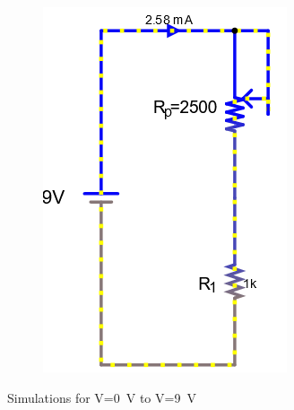 \documentclass[a4paper]{article}
\begin{document}
\begin{figure}[H]
\begin{subfigure}{0.333\textwidth}
        \includegraphics[width=.9\linewidth]{amp9}
    \end{subfigure}
    \caption{Simulations for V=\SI{0}{\volt} to V=\SI{9}{\volt} }
    \label{fig:1}
\end{figure}
\end{document}

